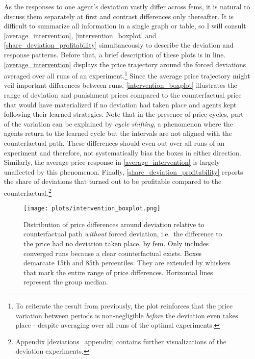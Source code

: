 As the responses to one agent's deviation vastly differ across \gls{fem}s, it is natural to discuss them separately at first and contrast differences only thereafter. It is difficult to summarize all information in a single graph or table, so I will consult \autoref{average_intervention}, \autoref{intervention_boxplot} and \autoref{share_deviation_profitability} simultaneously to describe the deviation and response patterns. Before that, a brief description of these plots is in line. \autoref{average_intervention} displays the price trajectory around the forced deviations averaged over all runs of an experiment.\footnote{To reiterate the result from previously, the plot reinforces that the price variation between periods is non-negligible \emph{before} the deviation even takes place - despite averaging over all runs of the optimal experiments.}  Since the average price trajectory might veil important differences between runs, \autoref{intervention_boxplot} illustrates the range of deviation and punishment prices compared to the counterfactual price that would have materialized if no deviation had taken place and agents kept following their learned strategies. Note that in the presence of price cycles, part of the variation can be explained by \emph{cycle shifting}, a phenomenon where the agents return to the learned cycle but the intervals are not aligned with the counterfactual path. These differences should even out over all runs of an experiment and therefore, not systematically bias the boxes in either direction. Similarly, the average price response in \autoref{average_intervention} is largely unaffected by this phenomenon. Finally, \autoref{share_deviation_profitability} reports the share of deviations that turned out to be profitable compared to the counterfactual.\footnote{Appendix \ref{deviations_appendix} contains further visualizations of the deviation experiments.}

\begin{figure}
	\texttt{[image: plots/intervention\_boxplot.png]}
	\caption[Distribution of price differences around deviation by \gls{fem}]{Distribution of price differences around deviation relative to counterfactual path \emph{without} forced deviation, i.e.\ the difference to the price had no deviation taken place, by \gls{fem}. Only includes converged runs because a clear counterfactual exists. Boxes demarcate 15th and 85th percentiles. They are extended by whiskers that mark the entire range of price differences. Horizontal lines represent the group median.}
	\label{intervention_boxplot}
\end{figure}

